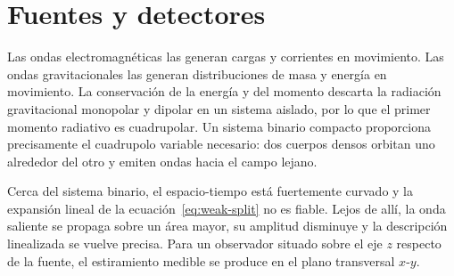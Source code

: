 \begin{classroomqa}
\end{classroomqa}

\section{Fuentes y detectores}

Las ondas electromagnéticas las generan cargas y corrientes en movimiento. Las ondas gravitacionales las generan distribuciones de masa y energía en movimiento. La conservación de la energía y del momento descarta la radiación gravitacional monopolar y dipolar en un sistema aislado, por lo que el primer momento radiativo es cuadrupolar. Un sistema binario compacto proporciona precisamente el cuadrupolo variable necesario: dos cuerpos densos orbitan uno alrededor del otro y emiten ondas hacia el campo lejano.

Cerca del sistema binario, el espacio-tiempo está fuertemente curvado y la expansión lineal de la ecuación~\eqref{eq:weak-split} no es fiable. Lejos de allí, la onda saliente se propaga sobre un área mayor, su amplitud disminuye y la descripción linealizada se vuelve precisa. Para un observador situado sobre el eje \(z\) respecto de la fuente, el estiramiento medible se produce en el plano transversal \(x\)-\(y\).

\begin{classroomqa}
\end{classroomqa}

